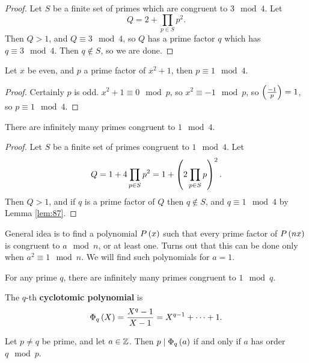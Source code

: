 \begin{proof}
Let $ S $ be a finite set of primes which are congruent to $ 3 \mod 4 $. Let
$$ Q = 2 + \prod_{p \in S} p^2. $$
Then $ Q > 1 $, and $ Q \equiv 3 \mod 4 $, so $ Q $ has a prime factor $ q $ which has $ q \equiv 3 \mod 4 $. Then $ q \notin S $, so we are done.
\end{proof}

\begin{lemma}
\label{lem:87}
Let $ x $ be even, and $ p $ a prime factor of $ x^2 + 1 $, then $ p \equiv 1 \mod 4 $.
\end{lemma}

\begin{proof}
Certainly $ p $ is odd. $ x^2 + 1 \equiv 0 \mod p $, so $ x^2 \equiv -1 \mod p $, so $ \jacobi{-1}{p} = 1 $, so $ p \equiv 1 \mod 4 $.
\end{proof}

\begin{theorem}
There are infinitely many primes congruent to $ 1 \mod 4 $.
\end{theorem}

\begin{proof}
Let $ S $ be a finite set of primes congruent to $ 1 \mod 4 $. Let
$$ Q = 1 + 4\prod_{p \in S} p^2 = 1 + \br{2\prod_{p \in S} p}^2. $$
Then $ Q > 1 $, and if $ q $ is a prime factor of $ Q $ then $ q \notin S $, and $ q \equiv 1 \mod 4 $ by Lemma \ref{lem:87}.
\end{proof}

General idea is to find a polynomial $ P\br{x} $ such that every prime factor of $ P\br{nx} $ is congruent to $ a \mod n $, or at least one. Turns out that this can be done only when $ a^2 \equiv 1 \mod n $. We will find such polynomials for $ a = 1 $.

\begin{theorem}
For any prime $ q $, there are infinitely many primes congruent to $ 1 \mod q $.
\end{theorem}

\pagebreak

\begin{definition}
The $ q $-th \textbf{cyclotomic polynomial} is
$$ \Phi_q\br{X} = \dfrac{X^q - 1}{X - 1} = X^{q - 1} + \dots + 1. $$
\end{definition}

\begin{theorem}
\label{thm:91}
Let $ p \ne q $ be prime, and let $ a \in \mathbb{Z} $. Then $ p \mid \Phi_q\br{a} $ if and only if $ a $ has order $ q \mod p $.
\end{theorem}

